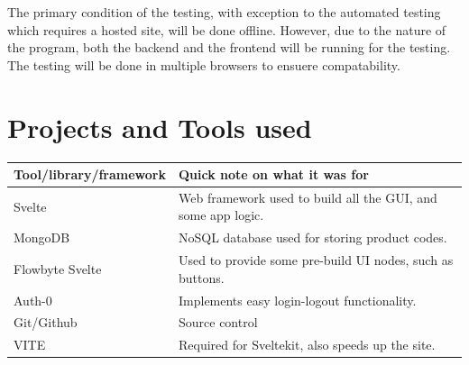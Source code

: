 The primary condition of the testing, with exception to the automated testing which
requires a hosted site, will be done offline. However, due to the nature of the program,
both the backend and the frontend will be running for the testing. The testing will be done
 in multiple browsers to ensuere compatability.




\section{Projects and Tools used}


\begin{longtable}{p{0.25\linewidth}p{0.75\linewidth}}
\toprule
Tool/library/framework & Quick note on what it was for \\
\midrule
Svelte & Web framework used to build all the GUI, and some app logic. \\
MongoDB & NoSQL database used for storing product codes. \\
Flowbyte Svelte & Used to provide some pre-build UI nodes, such as buttons. \\
Auth-0 & Implements easy login-logout functionality. \\
Git/Github & Source control \\
VITE & Required for Sveltekit, also speeds up the site. \\

\bottomrule
\end{longtable}

